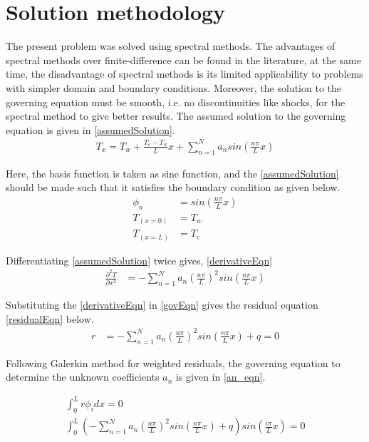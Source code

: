 \documentclass[conf]{new-aiaa}
\begin{document}
\section{Solution methodology}
The present problem was solved using spectral methods. The advantages of
spectral methods over finite-difference can be found in the literature, at the
same time, the disadvantage of spectral methods is its limited applicability
to problems with simpler domain and boundary conditions. Moreover, the solution
to the governing equation must be smooth, i.e. no discontinuities like shocks,
for the spectral method to give better results. The assumed solution to the
governing equation is given in \cref{assumedSolution}.
\begin{align}
    T_x = T_w + \frac{T_e - T_w}{L}x + \sum_{n=1}^N a_n sin\left(\frac{n\pi}{L}x\right) \label{assumedSolution}
\end{align}

\par Here, the basis function is taken as sine function, and the \cref{assumedSolution}
should be made such that it satisfies the boundary condition as given below.
\begin{align*}
    \phi_n &= sin\left(\frac{n \pi}{L}x\right) \\
    T_{(x=0)} &= T_w \\
    T_{(x=L)} &= T_e
\end{align*}

\par Differentiating \cref{assumedSolution} twice gives, \cref{derivativeEqn}
\begin{align}
    \frac{\partial^2 T}{\partial x^2} &= - \sum_{n=1}^N a_n \left(\frac{n \pi}{L}\right)^2 sin \left(\frac{n \pi}{L}x\right) \label{derivativeEqn}
\end{align}

\par Substituting the \cref{derivativeEqn} in \cref{govEqn} gives the residual equation \cref{residualEqn} below.
\begin{align}
    r  &= - \sum_{n=1}^N a_n \left(\frac{n \pi}{L}\right)^2 sin \left(\frac{n \pi}{L}x\right)  + q = 0 \label{residualEqn}
\end{align}

\par Following Galerkin method for weighted residuals, the governing equation to
determine the unknown coefficients $a_n$ is given in \cref{an_eqn}.

\begin{align}
    \int_0^L r \phi_i dx = 0 \label{an_eqn} \\
    \int_0^L \left(- \sum_{n=1}^N a_n \left(\frac{n \pi}{L}\right)^2 sin \left(\frac{n \pi}{L}x\right)  + q \right)  sin\left(\frac{i\pi}{L}x\right) = 0 \nonumber
\end{align}
\end{document}
